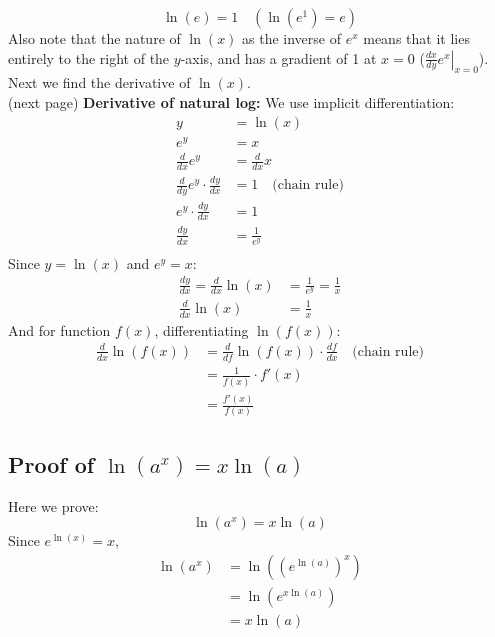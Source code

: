 \documentclass{report}
\begin{document}
\begin{equation*}
\ln(e)=1\quad(\ln(e^1)=e)
\end{equation*}
Also note that the nature of $\ln(x)$ as the inverse of $e^x$ means that it lies entirely to the
right of the $y$-axis, and has a gradient of 1 at $x=0$ ($\left.\frac{dx}{dy}e^x\right|_{x=0}$).
Next we find the derivative of $\ln(x)$.\\
(next page)
\newpage
\noindent\textbf{Derivative of natural log:} We use implicit differentiation:
\begin{align*}
y&=\ln(x)\\
e^y&=x\\
\frac{d}{dx}e^y&=\frac{d}{dx}x\\
\frac{d}{dy}e^y\cdot\frac{dy}{dx}&=1\quad\text{(chain rule)}\\
e^y\cdot\frac{dy}{dx}&=1\\
\frac{dy}{dx}&=\frac{1}{e^y}\\
\end{align*}
Since $y=\ln(x)$ and $e^y=x$:
\begin{align*}
\frac{dy}{dx}=\frac{d}{dx}\ln(x)&=\frac{1}{e^y}=\frac{1}{x}\\
\frac{d}{dx}\ln(x)&=\frac{1}{x}
\end{align*}
And for function $f(x)$, differentiating $\ln(f(x))$:
\begin{align*}
\frac{d}{dx}\ln(f(x))&=\frac{d}{df}\ln(f(x))\cdot\frac{df}{dx}\quad\text{(chain rule)}\\
&=\frac{1}{f(x)}\cdot f'(x)\\
&=\frac{f'(x)}{f(x)}
\end{align*}

\subsection{Proof of $\ln(a^x)=x\ln(a)$} %
Here we prove:
\begin{equation*}
\ln(a^x)=x\ln(a)
\end{equation*}
Since $e^{\ln(x)}=x$,
\begin{align*}
\ln(a^x)&=\ln((e^{\ln(a)})^x)\\
&=\ln(e^{x\ln(a)})\\
&=x\ln(a)
\end{align*}
\newpage
\end{document}
